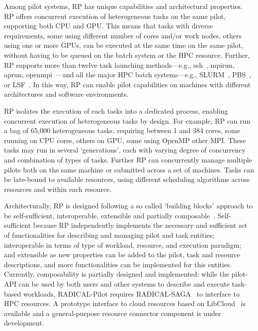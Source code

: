 \documentclass{webofc}
\begin{document}
Among pilot systems, RP has unique capabilities and architectural properties.
RP offers concurrent execution of heterogeneous tasks on the same pilot,
supporting both CPU and GPU. This means that tasks with diverse requirements,
some using different number of cores and/or work nodes, others using one or
more GPUs, can be executed at the same time on the same pilot, without having
to be queued on the batch system or the HPC resource. Further, RP supports
more than twelve task launching methods---e.g., ssh~\cite{ssh}, mpirun,
aprun, openmpi~\cite{gropp1999using}---and all the major HPC batch
systems---e.g., SLURM~\cite{yoo2003slurm}, PBS~\cite{henderson1995job}, or
LSF~\cite{zhou1992lsf}. In this way, RP can enable pilot capabilities on
machines with different architectures and software environments.

RP isolates the execution of each tasks into a dedicated process, enabling
concurrent execution of heterogeneous tasks by design. For example, RP can
run a bag of 65,000 heterogeneous tasks, requiring between 1 and 384 cores,
some running on CPU cores, others on GPU, some using OpenMP other MPI. These
tasks may run in several ‘generations’, each with varying degree of
concurrency and combination of types of tasks. Further RP can concurrently
manage multiple pilots both on the same machine or submitted across a set of
machines. Tasks can be late-bound to available resources, using different
scheduling algorithms across resources and within each resource.
	
Architecturally, RP is designed following a so called ‘building blocks’
approach to be self-sufficient, interoperable, extensible and partially
composable~\cite{turilli2018building}. Self-sufficient because RP
independently implements the necessary and sufficient set of functionalities
for describing and managing pilot and task entities; interoperable in terms
of type of workload, resource, and execution paradigm; and extensible as new
properties can be added to the pilot, task and resource descriptions, and
more functionalities can be implemented for this entities. Currently,
composability is partially designed and implemented: while the pilot-API can
be used by both users and other systems to describe and execute task-based
workloads, RADICAL-Pilot requires
RADICAL-SAGA~\cite{goodale2006saga,merzky2015saga,radical-saga} to interface
to HPC resources. A prototype interface to cloud resources based on
LibCloud~\cite{LibCloud} is available and a general-purpose resource
connector component is under development.
	
\end{document}
